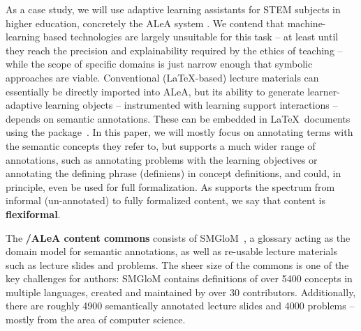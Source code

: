 \documentclass[runningheads]{llncs}
\newcommand\ALeA{\textsf{ALeA}\xspace}
\newcommand\SMGloM{\textsf{SMGloM}\xspace}
\begin{document}
As a case study, we will use adaptive learning assistants for STEM subjects in higher education, concretely the \ALeA system \cite{BerBetChu:lssmkm23}.
We contend that machine-learning based technologies are largely unsuitable for this task -- at least until they reach the
precision and explainability required by the ethics of teaching --
while the scope of specific domains is just narrow enough that symbolic approaches are viable.
Conventional (\LaTeX-based) lecture materials can essentially be directly imported into \ALeA,
but its ability to generate learner-adaptive learning objects -- instrumented with learning support interactions --
depends on semantic annotations.
These can be embedded in \LaTeX\ documents using the \sTeX package~\cite{MueKo:sdstex22,sTeX:github:on}.
In this paper, we will mostly focus on annotating terms with the semantic concepts they refer to,
but \sTeX supports a much wider range of annotations, such as annotating problems with the learning objectives
or annotating the defining phrase (definiens) in concept definitions,
and could, in principle, even be used for full formalization.
As \sTeX supports the spectrum from informal (un-annotated) to fully formalized content,
we say that \sTeX content is \textbf{flexiformal}.

The \textbf{\sTeX/\ALeA content commons} consists of \SMGloM~\cite{GinIanJuc:spsttom16},
a glossary acting as the domain model for semantic annotations,
as well as re-usable lecture materials such as lecture slides and problems.
The sheer size
of the commons is one of the key challenges for authors: \SMGloM contains definitions of over
5400 concepts in multiple languages, created and maintained by over 30
contributors.  Additionally, there are roughly 4900
semantically annotated lecture slides and 4000 problems
-- mostly from the area of computer science.

% 
\end{document}
